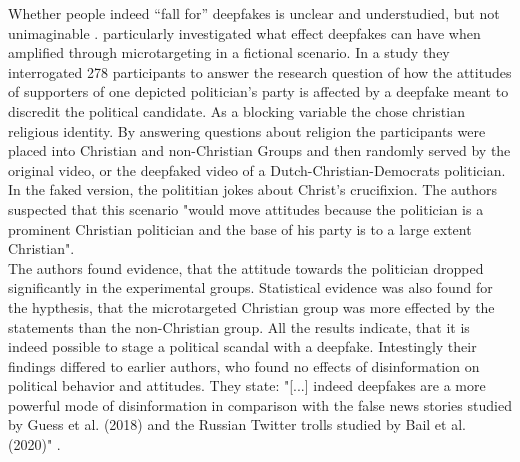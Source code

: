 \documentclass[
  a4paper,  %
  twoside,  %
  bibliography=totoc,
  headsepline,
  cleardoublepage=empty,
  parskip=half,
  draft=false
]{scrbook}
\begin{document}
Whether people indeed “fall for” deepfakes is unclear and understudied, but not unimaginable \cite{dobberMicrotargetedDeepfakesHave2021}. \citet{dobberMicrotargetedDeepfakesHave2021} particularly investigated what effect deepfakes can have when amplified through microtargeting in a fictional scenario. In a study they interrogated 278 participants to answer the research question of how the attitudes of supporters of one depicted politician's party is affected by a deepfake meant to discredit the political candidate. As a blocking variable the chose christian religious identity. By answering questions about religion the participants were placed into Christian and non-Christian Groups and then randomly served by the original video, or the deepfaked video of a Dutch-Christian-Democrats politician. In the faked version, the polititian jokes about Christ's crucifixion. The authors suspected that this scenario "would move attitudes because the politician is a prominent Christian politician and the base of his party is to a large extent Christian". \\
The authors found evidence, that the attitude towards the politician dropped significantly in the experimental groups.
Statistical evidence was also found for the hypthesis, that the microtargeted Christian group was more effected by the statements than the non-Christian group. All the results indicate, that it is indeed possible to stage a political scandal with a deepfake. Intestingly their findings differed to earlier authors, who found no effects of disinformation on political behavior and attitudes. They state: "[...] indeed deepfakes are a more powerful mode of disinformation in comparison with the false news stories studied by Guess et al. (2018) and the Russian Twitter trolls studied by Bail et al. (2020)" \cite{dobberMicrotargetedDeepfakesHave2021}.
\end{document}
